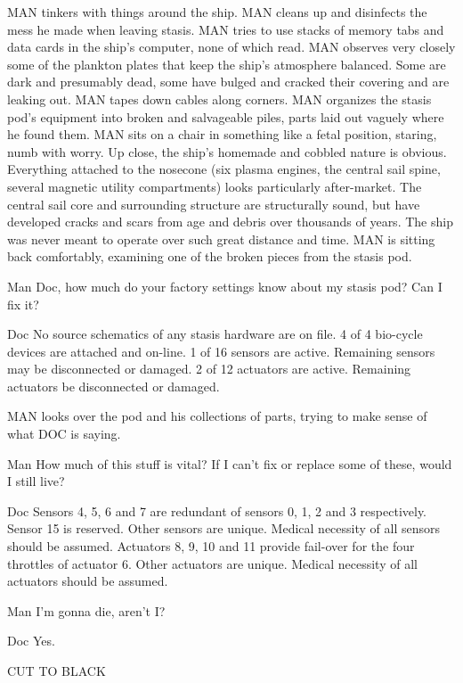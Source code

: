 \documentclass{screenplay}
\begin{document}
\intercut
{}
MAN tinkers with things around the ship.  MAN cleans up and disinfects the mess he made when leaving stasis.  MAN tries to use stacks of memory tabs and data cards in the ship's computer, none of which read.  MAN observes very closely some of the plankton plates that keep the ship's atmosphere balanced.  Some are dark and presumably dead, some have bulged and cracked their covering and are leaking out.  MAN tapes down cables along corners.  MAN organizes the stasis pod's equipment into broken and salvageable piles, parts laid out vaguely where he found them.  MAN sits on a chair in something like a fetal position, staring, numb with worry.
Up close, the ship's homemade and cobbled nature is obvious.  Everything attached to the nosecone (six plasma engines, the central sail spine, several magnetic utility compartments) looks particularly after-market.  The central sail core and surrounding structure are structurally sound, but have developed cracks and scars from age and debris over thousands of years.  The ship was never meant to operate over such great distance and time.
MAN is sitting back comfortably, examining one of the broken pieces from the stasis pod.
\begin{dialogue}{Man}
Doc, how much do your factory settings know about my stasis pod?  Can I fix it?
\end{dialogue}
\begin{dialogue}{Doc}
No source schematics of any stasis hardware are on file.  4 of 4 bio-cycle devices are attached and on-line.  1 of 16 sensors are active.  Remaining sensors may be disconnected or damaged.  2 of 12 actuators are active.  Remaining actuators be disconnected or damaged.
\end{dialogue}
MAN looks over the pod and his collections of parts, trying to make sense of what DOC is saying.
\begin{dialogue}{Man}
How much of this stuff is vital?  If I can't fix or replace some of these, would I still live?
\end{dialogue}
\begin{dialogue}{Doc}
Sensors 4, 5, 6 and 7 are redundant of sensors 0, 1, 2 and 3 respectively.  Sensor 15 is reserved.  Other sensors are unique.  Medical necessity of all sensors should be assumed.  Actuators 8, 9, 10 and 11 provide fail-over for the four throttles of actuator 6.  Other actuators are unique.  Medical necessity of all actuators should be assumed.
\end{dialogue}
\begin{dialogue}{Man}
I'm gonna die, aren't I?
\end{dialogue}
\begin{dialogue}{Doc}
Yes.
\end{dialogue}
CUT TO BLACK
\end{document}
